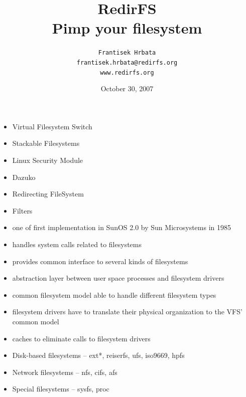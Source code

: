 \documentclass[30pt,a4paper,landscape,headrule,footrule]{foils}
\title{RedirFS \\ Pimp your filesystem \\ [1cm]}
\author{\tt{Frantisek Hrbata} \\ \tt{frantisek.hrbata@redirfs.org} \\
\tt{www.redirfs.org} \\ [1cm]}
\date{October 30, 2007}
\begin{document}
\maketitle

\begin{itemize}
\item Virtual Filesystem Switch
\item Stackable Filesystems
\item Linux Security Module
\item Dazuko
\item Redirecting FileSystem
\item Filters
\end{itemize}


\begin{itemize}
\item one of first implementation in SunOS 2.0 by Sun Microsystems in 1985
\item handles system calls related to filesystems
\item provides common interface to several kinds of filesystems
\item abstraction layer between user space processes and filesystem drivers
\end{itemize}

\begin{itemize}
\item common filesystem model able to handle different filesystem types
\item filesystem drivers have to translate their physical organization to the
VFS' common model
\item caches to eliminate calls to filesystem drivers
\end{itemize}


\begin{itemize}
\item Disk-based filesystems -- ext*, reiserfs, ufs, iso9669, hpfs
\item Network filesystems -- nfs, cifs, afs
\item Special filesystems -- sysfs, proc
\end{itemize}
\end{document}
